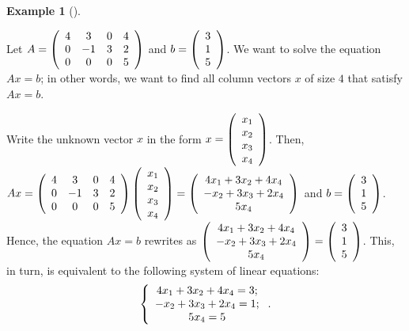 \documentclass[numbers=enddot,12pt,final,onecolumn,notitlepage]{scrartcl}%
\theoremstyle{definition}
\newtheorem{exam}[theo]{Example}
\newenvironment{example}[1][]
{\begin{exam}[#1]\begin{leftbar}}
{\end{leftbar}\end{exam}}
\begin{document}
\begin{example}
\label{exam.row-echelon.backsub.2}Let $A=\left(
\begin{array}
[c]{cccc}%
4 & 3 & 0 & 4\\
0 & -1 & 3 & 2\\
0 & 0 & 0 & 5
\end{array}
\right)  $ and $b=\left(
\begin{array}
[c]{c}%
3\\
1\\
5
\end{array}
\right)  $. We want to solve the equation $Ax=b$; in other words, we want to
find all column vectors $x$ of size $4$ that satisfy $Ax=b$.

Write the unknown vector $x$ in the form $x=\left(
\begin{array}
[c]{c}%
x_{1}\\
x_{2}\\
x_{3}\\
x_{4}%
\end{array}
\right)  $. Then, $Ax=\left(
\begin{array}
[c]{cccc}%
4 & 3 & 0 & 4\\
0 & -1 & 3 & 2\\
0 & 0 & 0 & 5
\end{array}
\right)  \left(
\begin{array}
[c]{c}%
x_{1}\\
x_{2}\\
x_{3}\\
x_{4}%
\end{array}
\right)  =\left(
\begin{array}
[c]{c}%
4x_{1}+3x_{2}+4x_{4}\\
-x_{2}+3x_{3}+2x_{4}\\
5x_{4}%
\end{array}
\right)  $ and $b=\left(
\begin{array}
[c]{c}%
3\\
1\\
5
\end{array}
\right)  $. Hence, the equation $Ax=b$ rewrites as $\left(
\begin{array}
[c]{c}%
4x_{1}+3x_{2}+4x_{4}\\
-x_{2}+3x_{3}+2x_{4}\\
5x_{4}%
\end{array}
\right)  =\left(
\begin{array}
[c]{c}%
3\\
1\\
5
\end{array}
\right)  $. This, in turn, is equivalent to the following system of linear
equations:%
\begin{equation}
\left\{
\begin{array}
[c]{c}%
4x_{1}+3x_{2}+4x_{4}=3;\\
-x_{2}+3x_{3}+2x_{4}=1;\\
5x_{4}=5
\end{array}
\right.  . \label{eq.exam.row-echelon.backsub.2.sys}%
\end{equation}



\end{example}
\end{document}
